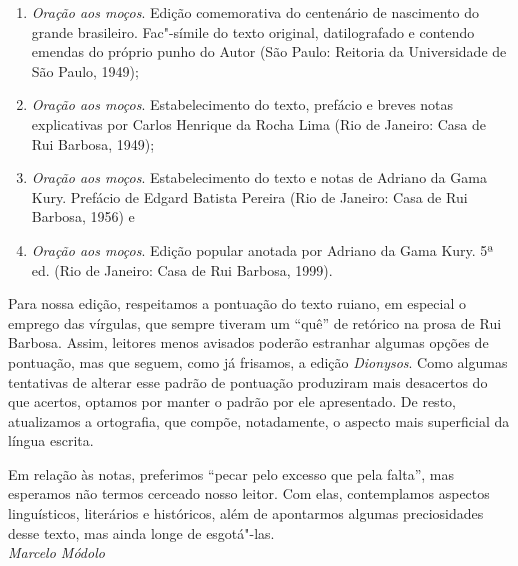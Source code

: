 \begin{enumerate}%

\item \textit{Oração aos moços}. Edição
comemorativa do centenário de nascimento do grande brasileiro.
Fac"-símile do texto original, datilografado e contendo emendas do
próprio punho do Autor (São Paulo: Reitoria da Universidade de São Paulo, 1949); 

\item \textit{Oração aos moços}. Estabelecimento do texto,
prefácio e breves notas explicativas por Carlos Henrique da Rocha Lima
(Rio de Janeiro: Casa de Rui Barbosa, 1949); 

\item \textit{Oração aos moços}. Estabelecimento do texto e notas 
de Adriano da Gama Kury. Prefácio de Edgard Batista Pereira 
(Rio de Janeiro: Casa de Rui Barbosa, 1956) e 

\item \textit{Oração aos moços}. Edição popular anotada
por Adriano da Gama Kury. 5ª ed. (Rio de Janeiro: Casa de Rui Barbosa, 1999).

\end{enumerate}


Para nossa edição, respeitamos a pontuação do texto ruiano, em especial
o emprego das vírgulas, que sempre tiveram um “quê” de retórico na
prosa de Rui Barbosa. Assim, leitores menos avisados poderão estranhar
algumas opções de pontuação, mas que seguem, como já frisamos, a edição
\textit{Dionysos}. Como algumas tentativas de alterar esse padrão de
pontuação produziram mais desacertos do que acertos, optamos por manter
o padrão por ele apresentado. De resto, atualizamos a ortografia, que
compõe, notadamente, o aspecto mais superficial da língua escrita. 

Em relação às notas, preferimos “pecar pelo excesso que pela falta”,
mas esperamos não termos cerceado nosso leitor. Com elas,
contemplamos aspectos linguísticos, literários e históricos, além de
apontarmos algumas preciosidades desse texto, mas ainda longe de esgotá"-las.
\ \\

\hfill\textit{Marcelo Módolo}


